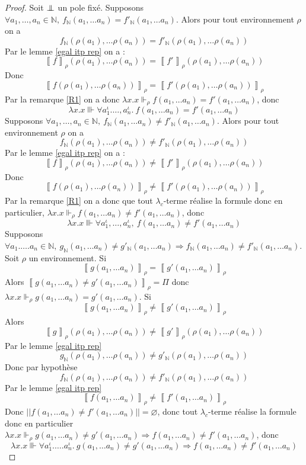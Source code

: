 \documentclass[a4paper,12pt]{article}
\theoremstyle{rmqstyle}
\newcommand{\N}{\mathbb{N}}
\newcommand{\abss}[1]{\lvert \lvert#1\rvert \rvert}
\newcommand{\itp}[1]{\left\llbracket#1\right\rrbracket}
\renewcommand{\implies}{\Rightarrow}
\newcommand{\pole}{{\protect\mathpalette{\protect\polehelper}{\bot}}} \def\polehelper#1#2{\mathrel{\rlap{$#1#2$}\mkern3mu{#1#2}}}
\begin{document}
\begin{proof}
Soit $\pole$ un pole fixé. Supposons $\forall a_1, \dots, a_n \in \N, \ f_\N(a_1, \dots a_n) = f'_\N (a_1, \dots a_n)$. Alors pour tout environnement $\rho$ on a
$$f_\N(\rho(a_1), \dots \rho(a_n)) = f'_\N (\rho(a_1), \dots \rho(a_n))$$
Par le lemme \ref{egal itp rep} on a : 
$$ \itp{f}_\rho (\rho(a_1), \dots \rho(a_n)) = \itp{f'}_\rho (\rho(a_1), \dots \rho(a_n))$$
Donc 
$$ \itp{f(\rho(a_1), \dots \rho(a_n))}_\rho = \itp{f'(\rho(a_1), \dots \rho(a_n))}_\rho$$
Par la remarque \ref{R1} on a donc $\lambda x.x \Vdash_\rho f(a_1, \dots a_n) = f'(a_1, \dots a_n)$, donc 
$$\lambda x.x \Vvdash \forall a_1^\iota. \dots, a_n^\iota. \ f(a_1, \dots a_n) = f'(a_1, \dots a_n)$$
Supposons $\forall a_1, \dots, a_n \in \N, \ f_\N(a_1, \dots a_n) \neq f'_\N (a_1, \dots a_n)$. Alors pour tout environnement $\rho$ on a
$$f_\N(\rho(a_1), \dots \rho(a_n)) \neq f'_\N (\rho(a_1), \dots \rho(a_n))$$
Par le lemme \ref{egal itp rep} on a : 
$$ \itp{f}_\rho (\rho(a_1), \dots \rho(a_n)) \neq \itp{f'}_\rho (\rho(a_1), \dots \rho(a_n))$$
Donc 
$$ \itp{f(\rho(a_1), \dots \rho(a_n))}_\rho \neq \itp{f'(\rho(a_1), \dots \rho(a_n))}_\rho$$
Par la remarque \ref{R1} on a donc que tout $\lambda_c$-terme réalise la formule donc en particulier, $\lambda x.x \Vdash_\rho f(a_1, \dots a_n) \neq f'(a_1, \dots a_n)$, donc 
$$\lambda x.x \Vvdash \forall a_1^\iota, \dots, a_n^\iota, \ f(a_1, \dots a_n) \neq f'(a_1, \dots a_n)$$
Supposons $\forall a_1. \dots. a_n \in \N, \ g_\N (a_1, \dots a_n) \neq g'_\N (a_1, \dots a_n) \implies f_\N(a_1, \dots a_n) \neq f'_\N (a_1, \dots a_n)$. Soit $\rho$ un environnement. Si 
$$\itp{g(a_1, \dots a_n)}_\rho = \itp{g'(a_1, \dots a_n)}_\rho$$
Alors $\itp{g(a_1, \dots a_n) \neq g'(a_1, \dots a_n)}_\rho = \Pi$ donc $\lambda x.x \Vdash_\rho g(a_1, \dots a_n) = g'(a_1, \dots a_n)$. Si 
$$\itp{g(a_1, \dots a_n)}_\rho \neq \itp{g'(a_1, \dots a_n)}_\rho$$
Alors 
$$\itp{g}_\rho (\rho(a_1), \dots \rho(a_n)) \neq \itp{g'}_\rho (\rho(a_1), \dots \rho(a_n))$$ 
Par le lemme \ref{egal itp rep}
$$g_\N (\rho(a_1), \dots \rho(a_n)) \neq g'_\N (\rho(a_1), \dots \rho(a_n))$$
Donc par hypothèse 
$$f_\N (\rho(a_1), \dots \rho(a_n)) \neq f'_\N (\rho(a_1), \dots \rho(a_n))$$
Par le lemme \ref{egal itp rep}
$$\itp{f(a_1, \dots a_n)}_\rho \neq \itp{f'(a_1, \dots a_n)}_\rho$$
Donc $\abss{f(a_1, \dots a_n) \neq f'(a_1, \dots a_n)} = \varnothing$, donc tout $\lambda_c$-terme réalise la formule donc en particulier $\lambda x.x \Vdash_\rho g(a_1, \dots a_n) \neq g'(a_1, \dots a_n) \implies  f(a_1, \dots a_n) \neq f'(a_1, \dots a_n)$, donc 
$$\lambda x.x \Vvdash \forall a_1^\iota. \dots. a_n^\iota. \ g(a_1, \dots a_n) \neq g'(a_1, \dots a_n) \implies  f(a_1, \dots a_n) \neq f'(a_1, \dots a_n)$$
\end{proof}
\end{document}
